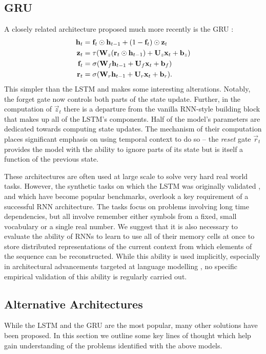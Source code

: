 \subsection{GRU}
A closely related architecture proposed much more recently is the
GRU \autocite{Cho2014}:
\begin{align}\label{eq:GRU}
	\mathbf{h}_t &= \mathbf{f}_t \odot \mathbf{h}_{t-1} + (1 - \mathbf{f}_t)\odot\mathbf{z}_t\\
	\mathbf{z}_t &= \tau(\mathbf{W}_z(\mathbf{r}_t \odot \mathbf{h}_{t-1}) + \mathbf{U}_z\mathbf{x}_t + \mathbf{b}_z)\\
	\mathbf{f}_t &= \sigma(\mathbf{W}_f\mathbf{h}_{t-1} + \mathbf{U}_f\mathbf{x}_t + \mathbf{b}_f)\\
	\mathbf{r}_t &= \sigma(\mathbf{W}_r\mathbf{h}_{t-1} + \mathbf{U}_r\mathbf{x}_t + \mathbf{b}_r).
\end{align} This simpler than the LSTM and makes some interesting alterations.
Notably, the forget gate now controls both parts of the state
update. Further, in the computation of \(\vec{z}_t\) there is a departure from the vanilla
RNN-style building block that makes up all of the LSTM's components. 
Half of the model's parameters are
dedicated towards computing state updates. The mechanism of their computation places
significant emphasis on using temporal context to do so -- the \emph{reset} gate
\(\vec{r}_t\) provides the model with the ability to ignore parts of its state but is itself a function of
the previous state.

These architectures are often used at large scale to solve very hard real world tasks. However,
the synthetic tasks on which the LSTM was originally validated \autocite{Hochreiter1997}, and which have
become popular benchmarks,
 overlook a key requirement of a successful RNN architecture. The tasks focus on problems involving long
time dependencies, but all involve remember either symbols from a fixed, small vocabulary or a single
real number. We suggest that it is also necessary to evaluate the ability of RNNs to learn to use
all of their memory cells at once to store distributed representations of the current context from which
elements of the sequence can be reconstructed. While this ability is used implicitly, especially in
architectural advancements targeted at language modelling \autocite{Cho2014b, Chan2015, Luong2016},
no specific empirical validation of this ability is regularly carried out.


\subsection{Alternative Architectures}
While the LSTM and the GRU are the most popular, many other solutions
have been proposed. In this section we outline some key lines of thought which help gain
understanding of the problems identified with the above models.

